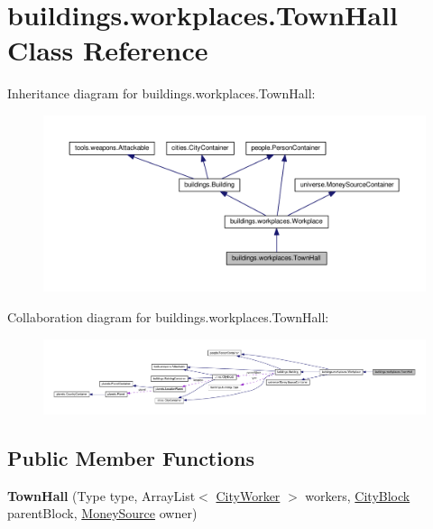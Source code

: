 \hypertarget{classbuildings_1_1workplaces_1_1_town_hall}{}\section{buildings.\+workplaces.\+Town\+Hall Class Reference}
\label{classbuildings_1_1workplaces_1_1_town_hall}


Inheritance diagram for buildings.\+workplaces.\+Town\+Hall\+:\nopagebreak
\begin{figure}[H]
\begin{center}
\leavevmode
\includegraphics[width=350pt]{classbuildings_1_1workplaces_1_1_town_hall__inherit__graph}
\end{center}
\end{figure}


Collaboration diagram for buildings.\+workplaces.\+Town\+Hall\+:\nopagebreak
\begin{figure}[H]
\begin{center}
\leavevmode
\includegraphics[width=350pt]{classbuildings_1_1workplaces_1_1_town_hall__coll__graph}
\end{center}
\end{figure}
\subsection*{Public Member Functions}
\begin{DoxyCompactItemize}
\item 
{\bfseries Town\+Hall} (Type type, Array\+List$<$ \hyperlink{classpeople_1_1cityworkers_1_1_city_worker}{City\+Worker} $>$ workers, \hyperlink{classcities_1_1_city_block}{City\+Block} parent\+Block, \hyperlink{classuniverse_1_1_money_source}{Money\+Source} owner)\hypertarget{classbuildings_1_1workplaces_1_1_town_hall_abfc23281507496a21c4a1d9fd84cbaa2}{}\label{classbuildings_1_1workplaces_1_1_town_hall_abfc23281507496a21c4a1d9fd84cbaa2}

\end{DoxyCompactItemize}
